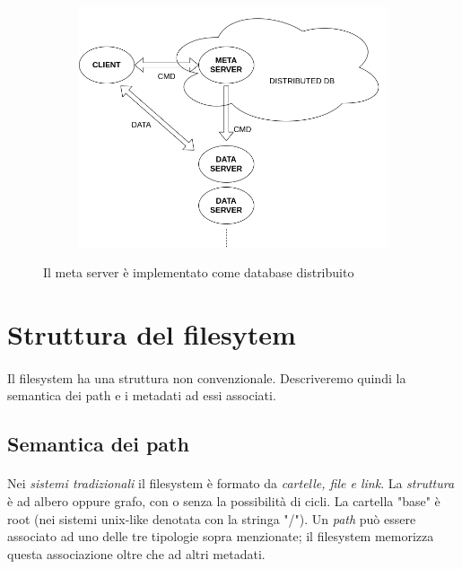 \documentclass[11pt,a4paper,english]{article}
\begin{document}
\begin{figure}[H]
	\centering
	\begin{subfigure}{0.80\linewidth}
		\includegraphics[width=\linewidth]{../diagrams/architettura/7.png}
	\end{subfigure}
	\caption{Il meta server è implementato come database distribuito}
\end{figure}


\section{Struttura del filesytem}

\paragraph{} Il filesystem\cite{fs} ha una struttura non convenzionale. Descriveremo quindi la semantica dei path e i metadati ad essi associati. 

\subsection{Semantica dei path}

\paragraph{} Nei \emph{sistemi tradizionali} il filesystem è formato da \emph{cartelle, file e link}. La \emph{struttura} è ad albero oppure grafo, con o senza la possibilità di cicli. La cartella "base" è root (nei sistemi unix-like denotata con la stringa "/"). Un \emph{path}\cite{path} può essere associato ad uno delle tre tipologie sopra menzionate; il filesystem memorizza questa associazione oltre che ad altri metadati. 
\end{document}
